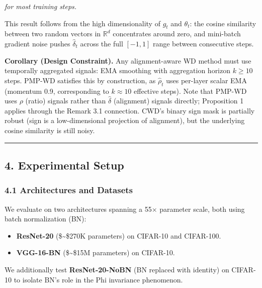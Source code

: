 \documentclass[
]{article}
\providecommand{\tightlist}{%
  \setlength{\itemsep}{0pt}\setlength{\parskip}{0pt}}
\begin{document}
\emph{for most training steps.}

This result follows from the high dimensionality of \(g_t\) and
\(\theta_t\): the cosine similarity between two random vectors in
\(\mathbb{R}^d\) concentrates around zero, and mini-batch gradient noise
pushes \(\hat{\delta}_t\) across the full \([-1, 1]\) range between
consecutive steps.

\textbf{Corollary (Design Constraint).} Any alignment-aware WD method
must use temporally aggregated signals: EMA smoothing with aggregation
horizon \(k \geq 10\) steps. PMP-WD satisfies this by construction, as
\(\hat{\rho}_t\) uses per-layer scalar EMA (momentum 0.9, corresponding
to \(k \approx 10\) effective steps). Note that PMP-WD uses \(\rho\)
(ratio) signals rather than \(\hat{\delta}\) (alignment) signals
directly; Proposition 1 applies through the Remark 3.1 connection. CWD's
binary sign mask is partially robust (sign is a low-dimensional
projection of alignment), but the underlying cosine similarity is still
noisy.

\begin{center}\rule{0.5\linewidth}{0.5pt}\end{center}

\hypertarget{experimental-setup}{%
\subsection{4. Experimental Setup}\label{experimental-setup}}

\hypertarget{architectures-and-datasets}{%
\subsubsection{4.1 Architectures and
Datasets}\label{architectures-and-datasets}}

We evaluate on two architectures spanning a 55\(\times\) parameter
scale, both using batch normalization (BN):

\begin{itemize}
\tightlist
\item
  \textbf{ResNet-20} (\$\sim\$270K parameters) on CIFAR-10 and
  CIFAR-100.
\item
  \textbf{VGG-16-BN} (\$\sim\$15M parameters) on CIFAR-10.
\end{itemize}

We additionally test \textbf{ResNet-20-NoBN} (BN replaced with identity)
on CIFAR-10 to isolate BN's role in the Phi invariance phenomenon.
\end{document}
